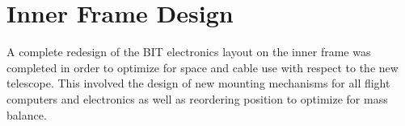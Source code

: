 \section{Inner Frame Design}
A complete redesign of the BIT electronics layout on the inner frame was completed in order to optimize for space and cable use with respect to the new telescope. This involved the design of new mounting mechanisms for all flight computers and electronics as well as reordering position to optimize for mass balance.


